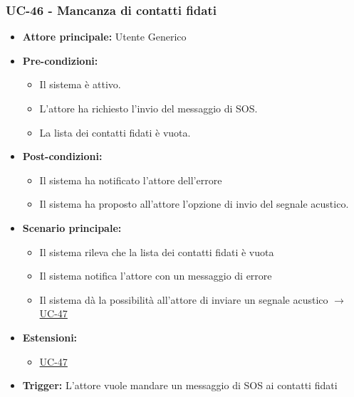\documentclass[a4paper,12pt]{article}
\begin{document}
\subsubsection{UC-46 - Mancanza di contatti fidati} \label{sec:UC-46}
\begin{itemize}
    \item \textbf{Attore principale:} Utente Generico
    \item \textbf{Pre-condizioni:}
    \begin{itemize}
        \item Il sistema è attivo.
	    \item L'attore ha richiesto l'invio del messaggio di SOS.
	    \item La lista dei contatti fidati è vuota.
    \end{itemize}	
    \item \textbf{Post-condizioni:} 
    \begin{itemize}
        \item Il sistema ha notificato l'attore dell'errore
        \item Il sistema ha proposto all'attore l'opzione di invio del segnale acustico.
    \end{itemize}
    \item \textbf{Scenario principale:} 
    \begin{itemize}
        \item Il sistema rileva che la lista dei contatti fidati è vuota
        \item Il sistema notifica l'attore con un messaggio di errore
        \item Il sistema dà la possibilità all'attore di inviare un segnale acustico $\rightarrow$  \hyperref[sec:UC-47]{UC-47}
    \end{itemize}
    \item \textbf{Estensioni:}
    \begin{itemize}
        \item  \hyperref[sec:UC-47]{UC-47}
    \end{itemize}
    \item \textbf{Trigger:} L'attore vuole mandare un messaggio di SOS ai contatti fidati
\end{itemize}
\end{document}
